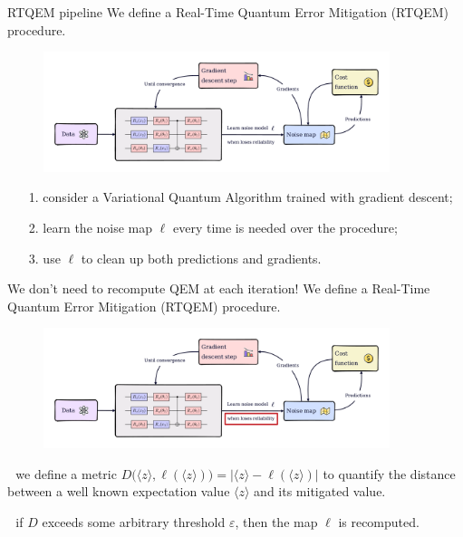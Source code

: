 \documentclass[8pt, xcolor={svgnames}, hyperref={linkcolor=black}, aspectratio=169]{beamer}
\begin{document}
\begin{frame}{RTQEM pipeline}
We define a Real-Time Quantum Error Mitigation (RTQEM) procedure.
\begin{figure}
    \includegraphics[width=0.9\textwidth]{figures/rtqem.pdf}
\end{figure}
\begin{itemize}[noitemsep]
\item[1.] consider a Variational Quantum Algorithm trained with gradient descent;
\item[2.] learn the noise map $\ell$ every time is needed over the procedure;
\item[3.] use $\ell$ to clean up both predictions and gradients.
\end{itemize}
\end{frame}


\begin{frame}{We don't need to recompute QEM at each iteration!}
\vspace{0.16cm}
We define a Real-Time Quantum Error Mitigation (RTQEM) procedure.
\begin{figure}
    \includegraphics[width=0.9\textwidth]{figures/rtqem_epsilon.png}
\end{figure}
\pause
\faEdit\,\, we define a metric $ D\bigl(\langle z \rangle, \ell(\langle z \rangle)\bigr) 
= |\langle z \rangle  - \ell(\langle z \rangle)|$
to quantify the distance between a well known expectation value $\langle z \rangle$ and its mitigated value.

\faAmbulance\,\, if $D$ exceeds some arbitrary threshold $\varepsilon$, then the
map $\ell$ is recomputed.
\end{frame}
\end{document}
